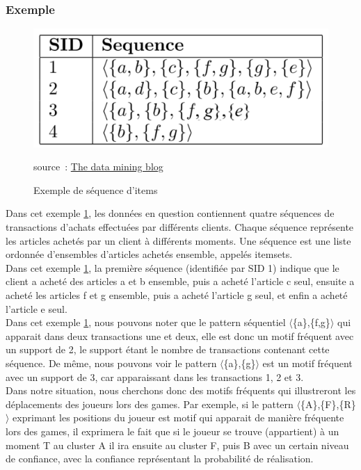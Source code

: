 \subsubsection{Exemple}
\begin{figure}[ht!]
    \centering
    \includegraphics{Images/seq2-1.png}
    \caption{Exemple de séquence d'items}
    \label{fig:seq}
    source : \href{https://data-mining.philippe-fournier-viger.com/wp-content/uploads/2017/03/seq2-1.png}{The data mining blog}
\end{figure}
Dans cet exemple \ref{fig:seq}, les données en question contiennent quatre séquences de transactions d'achats effectuées par différents clients. Chaque séquence représente les articles achetés par un client à différents moments. Une séquence est une liste ordonnée d'ensembles d'articles achetés ensemble, appelés itemsets.\\
Dans cet exemple \ref{fig:seq}, la première séquence (identifiée par SID 1) indique que le client a acheté des articles a et b ensemble, puis a acheté l'article c seul, ensuite a acheté les articles f et g ensemble, puis a acheté l'article g seul, et enfin a acheté l'article e seul.\\
Dans cet exemple \ref{fig:seq}, nous pouvons noter que le pattern séquentiel $\langle$\{a\},\{f,g\}$\rangle$ qui apparait dans deux transactions une et deux, elle est donc un motif fréquent avec un support de 2, le support étant le nombre de transactions contenant cette séquence. De même, nous pouvons voir le pattern $\langle$\{a\},\{g\}$\rangle$ est un motif fréquent avec un support de 3, car apparaissant dans les transactions 1, 2 et 3.\\

Dans notre situation, nous cherchons donc des motifs fréquents qui illustreront les déplacements des joueurs lors des games. Par exemple, si le pattern $\langle$\{A\},\{F\},\{R\}$\rangle$ exprimant les positions du joueur est motif qui apparait de manière fréquente lors des games, il exprimera le fait que si le joueur se trouve (appartient) à un moment T au cluster A il ira ensuite au cluster F, puis B avec un certain  niveau de confiance, avec la confiance représentant la probabilité de réalisation.
